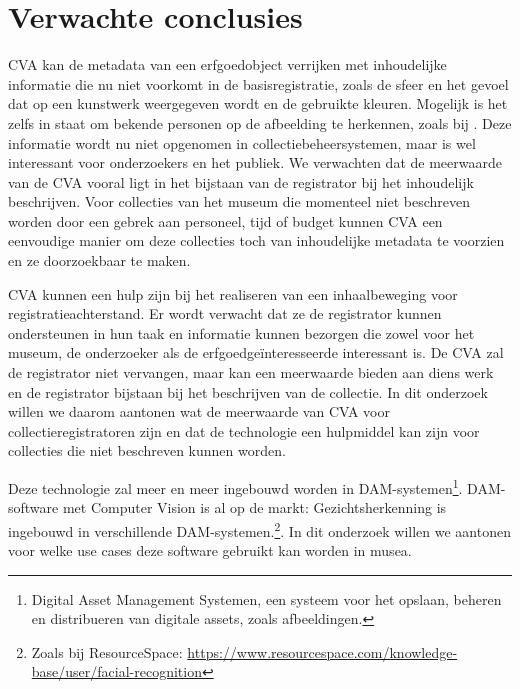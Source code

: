 \section{Verwachte conclusies}
\label{sec:verwachte_conclusies}

CVA kan de metadata van een erfgoedobject verrijken met inhoudelijke informatie die nu niet voorkomt in de basisregistratie, zoals de sfeer en het gevoel dat op een kunstwerk weergegeven wordt en de gebruikte kleuren. Mogelijk is het zelfs in staat om bekende personen op de afbeelding te herkennen, zoals bij \textcite{Hindle2017}. Deze informatie wordt nu niet opgenomen in collectiebeheersystemen, maar is wel interessant voor onderzoekers en het publiek. We verwachten dat de meerwaarde van de CVA vooral ligt in het bijstaan van de registrator bij het inhoudelijk beschrijven. Voor collecties van het museum die momenteel niet beschreven worden door een gebrek aan personeel, tijd of budget kunnen CVA een eenvoudige manier om deze collecties toch van inhoudelijke metadata te voorzien en ze doorzoekbaar te maken.

CVA kunnen een hulp zijn bij het realiseren van een inhaalbeweging voor registratieachterstand. Er wordt verwacht dat ze de registrator kunnen ondersteunen in hun taak en informatie kunnen bezorgen die zowel voor het museum, de onderzoeker als de erfgoedge{\"i}nteresseerde interessant is. De CVA zal de registrator niet vervangen, maar kan een meerwaarde bieden aan diens werk en de registrator bijstaan bij het beschrijven van de collectie. In dit onderzoek willen we daarom aantonen wat de meerwaarde van CVA voor collectieregistratoren zijn en dat de technologie een hulpmiddel kan zijn voor collecties die niet beschreven kunnen worden.

Deze technologie zal meer en meer ingebouwd worden in DAM-systemen\footnote{Digital Asset Management Systemen, een systeem voor het opslaan, beheren en distribueren van digitale assets, zoals afbeeldingen.}. DAM-software met Computer Vision is al op de markt: Gezichtsherkenning is ingebouwd in verschillende DAM-systemen.\footnote{Zoals bij ResourceSpace: \url{https://www.resourcespace.com/knowledge-base/user/facial-recognition}}. In dit onderzoek willen we aantonen voor welke use cases deze software gebruikt kan worden in musea.